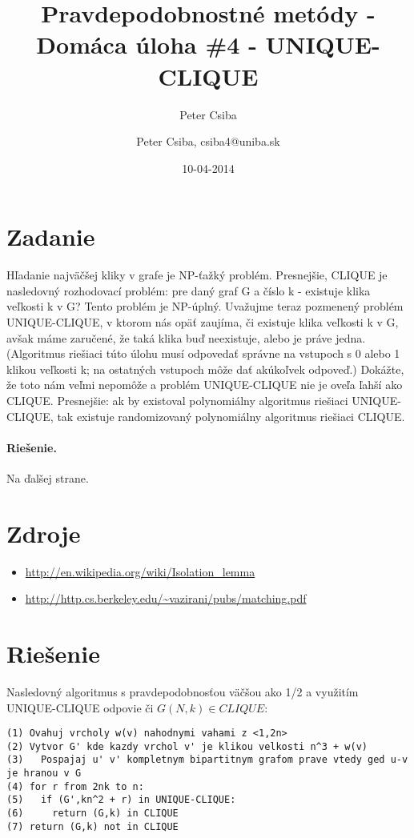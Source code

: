 \documentclass[12pt,a4paper]{article}
\author{Peter Csiba}
\title{Pravdepodobnostné metódy - Domáca úloha \#4 - UNIQUE-CLIQUE}
\date{10-04-2014}
\author{Peter Csiba, csiba4@uniba.sk}
\begin{document}
\maketitle

\section*{Zadanie}
Hľadanie najväčšej kliky v grafe je NP-ťažký problém. Presnejšie, CLIQUE je nasledovný rozhodovací problém: pre daný graf G a číslo k - existuje klika veľkosti k v G? Tento problém je NP-úplný. Uvažujme teraz pozmenený problém UNIQUE-CLIQUE, v ktorom nás opäť zaujíma, či existuje klika veľkosti k v G, avšak máme zaručené, že taká klika buď neexistuje, alebo je práve jedna. (Algoritmus riešiaci túto úlohu musí odpovedať správne na vstupoch s 0 alebo 1 klikou veľkosti k; na ostatných vstupoch môže dať akúkoľvek odpoveď.) Dokážte, že toto nám veľmi nepomôže a problém UNIQUE-CLIQUE nie je oveľa ľahší ako CLIQUE. Presnejšie: ak by existoval polynomiálny algoritmus riešiaci UNIQUE-CLIQUE, tak existuje randomizovaný polynomiálny algoritmus riešiaci CLIQUE.

\paragraph{Riešenie.}
Na ďalšej strane. 

\section*{Zdroje} 
\begin{itemize} 
\item \url{http://en.wikipedia.org/wiki/Isolation_lemma} 
\item \url{http://http.cs.berkeley.edu/~vazirani/pubs/matching.pdf} 
\end{itemize} 

\newpage
\section*{Riešenie}
Nasledovný algoritmus s pravdepodobnosťou väčšou ako 1/2 a využitím UNIQUE-CLIQUE odpovie či $G(N,k) \in CLIQUE$:

\begin{lstlisting} 
(1) Ovahuj vrcholy w(v) nahodnymi vahami z <1,2n> 
(2) Vytvor G' kde kazdy vrchol v' je klikou velkosti n^3 + w(v) 
(3)   Pospajaj u' v' kompletnym bipartitnym grafom prave vtedy ged u-v je hranou v G
(4) for r from 2nk to n:
(5)   if (G',kn^2 + r) in UNIQUE-CLIQUE:
(6)     return (G,k) in CLIQUE
(7) return (G,k) not in CLIQUE
\end{lstlisting} 
\end{document}
